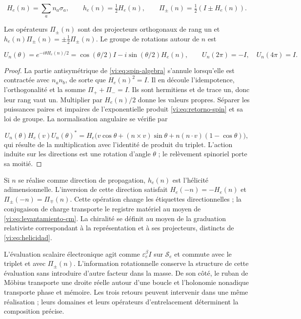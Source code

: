 \begin{equation}
 H_e(n)=\sum_an_a\sigma_a,\qquad
 h_e(n)=\tfrac12H_e(n),\qquad
 \Pi_\pm(n)=\tfrac12(I\pm H_e(n)).
 \label{vi:eq:helicidad}
\end{equation}

\begin{proposition}
\label{vi:prop:helicidad}
Les opérateurs $\Pi_\pm(n)$ sont des projecteurs orthogonaux de
rang un et $h_e(n)\Pi_\pm(n)=\pm\tfrac12\Pi_\pm(n)$.
Le groupe de rotations autour de $n$ est

\begin{equation}
 U_n(\theta)=e^{-i\theta H_e(n)/2}
 =\cos(\theta/2)I-i\sin(\theta/2)H_e(n),\qquad
 U_n(2\pi)=-I,\quad U_n(4\pi)=I.
 \label{vi:eq:retorno-spin}
\end{equation}
\end{proposition}
\begin{proof}
La partie antisymétrique de \eqref{vi:eq:spin-algebra} s’annule
lorsqu’elle est contractée avec $n_an_b$, de sorte que $H_e(n)^2=I$.
Il en découle l’idempotence, l’orthogonalité et la somme
$\Pi_++\Pi_-=I$. Ils sont hermitiens et de trace un, donc leur
rang vaut un. Multiplier par $H_e(n)/2$ donne les valeurs propres.
Séparer les puissances paires et impaires de l’exponentielle produit
\eqref{vi:eq:retorno-spin} et sa loi de groupe. La normalisation
angulaire se vérifie par

\[
 U_n(\theta)H_e(v)U_n(\theta)^*
 =H_e\bigl(v\cos\theta+(n\times v)\sin\theta
       +n(n\cdot v)(1-\cos\theta)\bigr),
\]
qui résulte de la multiplication avec l’identité de produit du
triplet. L’action induite sur les directions est une rotation
d’angle $\theta$ ; le relèvement spinoriel porte sa moitié.

\end{proof}

Si $n$ se réalise comme direction de propagation, $h_e(n)$ est
l’hélicité adimensionnelle. L’inversion de cette direction satisfait
$H_e(-n)=-H_e(n)$ et $\Pi_\pm(-n)=\Pi_\mp(n)$.
Cette opération change les étiquettes directionnelles ; la conjugaison
de charge transporte le registre matériel au moyen de
\eqref{vi:eq:levantamiento-cm}. La chiralité se définit au moyen de
la graduation relativiste correspondant à la représentation et à
ses projecteurs, distincts de \eqref{vi:eq:helicidad}.


L’évaluation scalaire électronique agit comme
$\varepsilon_e^\beta I$ sur $\mathscr S_e$ et commute avec
le triplet et avec $\Pi_\pm(n)$. L’information rotationnelle conserve
la structure de cette évaluation sans introduire d’autre facteur dans
la masse. De son côté, le ruban de Möbius transporte une droite
réelle autour d’une boucle et l’holonomie nonadique transporte
phase et mémoire. Les trois retours peuvent intervenir dans une
même réalisation ; leurs domaines et leurs opérateurs d’entrelacement déterminent la
composition précise.

